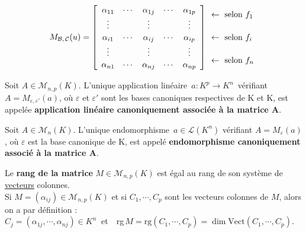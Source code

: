 \[ M_{\mathcal{B},\,\mathcal{C}}(u)=\left[\begin{array}{ccccc}
    \alpha_{11} & \cdots & \alpha_{1j} & \cdots & \alpha_{1p} \\
    \vdots & & \vdots & & \vdots \\
    \alpha_{i1} & \cdots & \alpha_{ij} & \cdots & \alpha_{ip} \\
    \vdots & & \vdots & & \vdots \\
    \alpha_{n1} & \cdots & \alpha_{nj} & \cdots & \alpha_{np} \\
\end{array} \right] 
\def\arraystretch{1.15} \begin{array}{l}
    \leftarrow \text{ selon } f_1 \\
    \\
    \leftarrow \text{ selon } f_i \\
    \\
    \leftarrow \text{ selon } f_n \\
\end{array}\]

\vspace{2cm}

Soit \(A\in \mathcal{M}_{n,p}(K)\). L'unique application linéaire \(\,a:K^p\to K^n\,\) vérifiant \(A=M_{\varepsilon,\varepsilon'}(a)\), où \(\varepsilon\) et \(\varepsilon'\) sont les bases canoniques respectives de K et K, est appelée \textbf{application linéaire canoniquement associée à la matrice A}.\vspace{0.2cm}

Soit \(A\in \mathcal{M}_n(K)\). L'unique endomorphisme \(\,a\in \mathscr{L}(K^n) \) vérifiant \(A=M_{\varepsilon}(a)\), où \(\varepsilon\) est la base canonique de K, est appelé \textbf{endomorphisme canoniquement associé à la matrice A}.

\vspace{1.5cm}

Le \textbf{rang de la matrice} \(M\in \mathcal{M}_{n,p}(K)\) est égal au rang de son système de \underline{vecteurs} colonnes.\vspace{0.1cm}\\
Si \(M=(\alpha_{ij})\in \mathcal{M}_{n,p}(K)\) et si \(C_1,\cdots, C_p\) sont les vecteurs colonnes de $M$, alors on a par définition :\vspace{0.1cm}\\
\(C_j=(\alpha_{1j},\cdots,\alpha_{nj})\in K^n\ \) et\ \, rg\(\,M=\text{rg}(C_1,\cdots,C_p)=\dim \text{Vect}(C_1,\cdots,C_p)\). 



